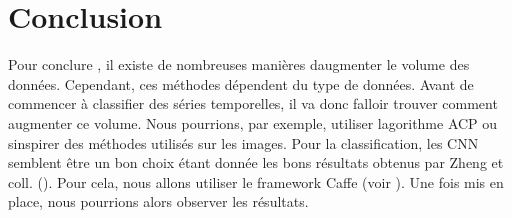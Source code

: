 \documentclass[11pt]{sdm}
\begin{document}
\bigbreak
\bigbreak
\section{Conclusion}
\label{seq:conclusion}
Pour conclure , il existe de nombreuses mani\`eres d\textquotesingle augmenter le volume des donn\'ees. Cependant, ces m\'ethodes d\'ependent du type de donn\'ees. Avant de commencer \`a classifier des s\'eries temporelles, il va donc falloir trouver comment augmenter ce volume. Nous pourrions, par exemple, utiliser l\textquotesingle agorithme ACP ou s\textquotesingle inspirer des m\'ethodes utilis\'es sur les images.
Pour la classification, les CNN semblent \^etre un bon choix \'etant donn\'ee les bons r\'esultats obtenus par Zheng et coll. (\cite{zheng2014time}). Pour cela, nous allons utiliser le framework Caffe (voir \cite{jia2014caffe}). Une fois mis en place, nous pourrions alors observer les r\'esultats.



\nocite{*}


\end{document}
